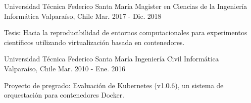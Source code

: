 \begin{cventries}
\cventry
{Universidad Técnica Federico Santa María}
{Magister en Ciencias de la Ingeniería Informática}
{Valparaíso, Chile}
{Mar. 2017 - Dic. 2018}
{
\begin{cvitems}
\item{Tesis: Hacia la reproducibilidad de entornos computacionales para experimentos científicos utilizando virtualización basada en contenedores.}
\end{cvitems}
}
\cventry
{Universidad Técnica Federico Santa María}
{Ingeniería Civil Informática}
{Valparaíso, Chile}
{Mar. 2010 - Ene. 2016}
{
\begin{cvitems}
\item {Proyecto de pregrado: Evaluación de Kubernetes (v1.0.6), un sistema de orquestación para contenedores Docker.}
\end{cvitems}
}
\end{cventries}